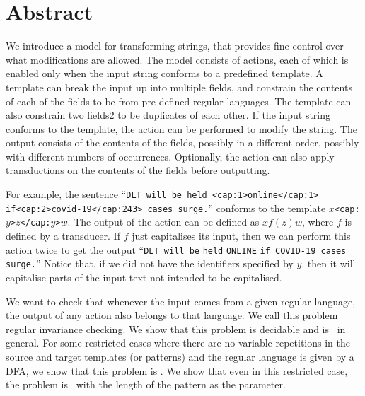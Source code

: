 
\section{Abstract}\label{sec:abstract-strings}

We introduce a model for transforming strings, that provides fine control over what modifications are allowed. The model consists of actions, each of which is enabled only when the input string conforms to a predefined template. A template can break the input up into multiple fields, and constrain the contents of each of the fields to be from pre-defined regular languages. The template can also constrain two fields2 to be duplicates of each other. If the input string conforms to the template, the action can be performed to modify the string. The output consists of the contents of the fields, possibly in a different order, possibly with different numbers of occurrences. Optionally, the action can also apply transductions on the contents of the fields before outputting.

For example, the sentence ``\verb|DLT will be held <cap:1>online</cap:1>| \verb|if|\verb|<cap:2>covid-19</cap:243> cases surge.|'' conforms to the template \texttt{$x$<cap:$y$>$z$</cap:$y$>$w$}. The output of the action can be defined as $xf(z)w$, where $f$ is defined by a transducer. If $f$ just capitalises its input, then we can perform this action twice to get the output ``\verb|DLT will be| \verb|held|  \verb|ONLINE| \verb|if COVID-19 cases surge.|'' Notice that, if we did not have the identifiers specified by $y$, then it will capitalise parts of the input text not intended to be capitalised.

We want to check that whenever the input comes from a given regular language, the output of any action also belongs to that language. We call this problem regular invariance checking. We show that this problem is decidable and is \pspc\ in general. For some restricted cases where there are no variable repetitions in the source and target templates (or patterns) and the regular language is given by a DFA, we show that this problem is \conpc. We show that even in this restricted case, the problem is \woneh\ with the length of the pattern as the parameter.

